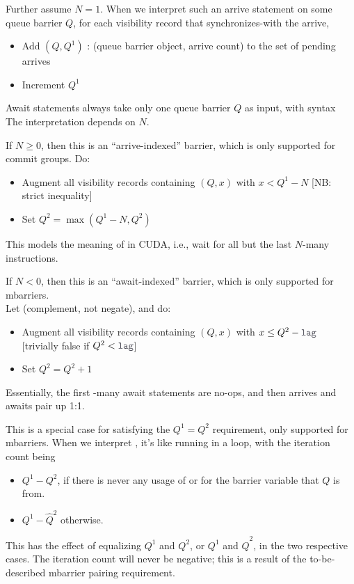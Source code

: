 \filbreak
Further assume $N = 1$.
When we interpret such an arrive statement on some queue barrier $Q$, for each visibility record that synchronizes-with the arrive,
\begin{itemize}
  \item Add $(Q, Q^1)$ : (queue barrier object, arrive count) to the set of pending arrives
  \item Increment $Q^1$
\end{itemize}

\filbreak
{}

Await statements always take only one queue barrier $Q$ as input, with syntax\\
The interpretation depends on $N$.

\filbreak
If $N \geq 0$, then this is an ``arrive-indexed'' barrier, which is only supported for commit groups. Do:
\begin{itemize}
  \item Augment all visibility records containing $(Q, x)$ with $x < Q^1 - N$ [NB: strict inequality]
  \item Set $Q^2 = \max(Q^1 - N, Q^2)$
\end{itemize}
This models the meaning of  in CUDA, i.e., wait for all but the last $N$-many  instructions.

\filbreak
If $N < 0$, then this is an ``await-indexed'' barrier, which is only supported for mbarriers.\\
Let  (complement, not negate), and do:
\begin{itemize}
  \item Augment all visibility records containing $(Q, x)$ with $x \leq Q^2 - \lighttt{lag}$ [trivially false if $Q^2 < \lighttt{lag}$]
  \item Set $Q^2 = Q^2 + 1$
\end{itemize}
Essentially, the first -many await statements are no-ops, and then arrives and awaits pair up 1:1.

\filbreak
{}

This is a special case for satisfying the $Q^1 = Q^2$ requirement, only supported for mbarriers.
When we interpret , it's like running
 in a loop, with the iteration count being
\begin{itemize}
  \item $Q^1 - Q^2$, if there is never any usage of  or  for the barrier variable that $Q$ is from.
  \item $Q^1 - \widehat{Q}^2$ otherwise.
\end{itemize}
This has the effect of equalizing $Q^1$ and $Q^2$, or $Q^1$ and $\widehat{Q}^2$, in the two respective cases.
The iteration count will never be negative; this is a result of the to-be-described mbarrier pairing requirement.

